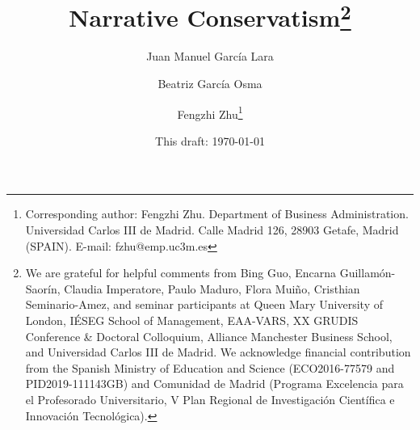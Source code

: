 \documentclass[letterpaper,12pt]{article}
\begin{document}
	
	\title{\textbf{Narrative Conservatism}\footnote{We are grateful for helpful comments from Bing Guo, Encarna Guillam\'on-Saor\'in, Claudia Imperatore, Paulo Maduro, Flora Muiño, Cristhian Seminario-Amez, and seminar participants at Queen Mary University of London, IÉSEG School of Management, EAA-VARS, XX GRUDIS Conference \& Doctoral Colloquium, Alliance Manchester Business School, and Universidad Carlos III de Madrid. We acknowledge financial contribution from the Spanish Ministry of Education and Science (ECO2016-77579 and PID2019-111143GB) and Comunidad de Madrid (Programa Excelencia para el Profesorado Universitario, V Plan Regional de Investigación Científica e Innovación Tecnológica).}}
		
	\author{\normalsize \vspace{0.5cm}Juan Manuel Garc\'ia Lara}
	
	\author{Beatriz Garc\'ia Osma}
	
	\author{Fengzhi Zhu\thanks{Corresponding author: Fengzhi Zhu. Department of Business Administration. Universidad Carlos III de Madrid. Calle Madrid 126, 28903 Getafe, Madrid (SPAIN). E-mail: fzhu@emp.uc3m.es}}
	
	
	\date{\small This draft: \today}
	
	\maketitle
	
\end{document}
